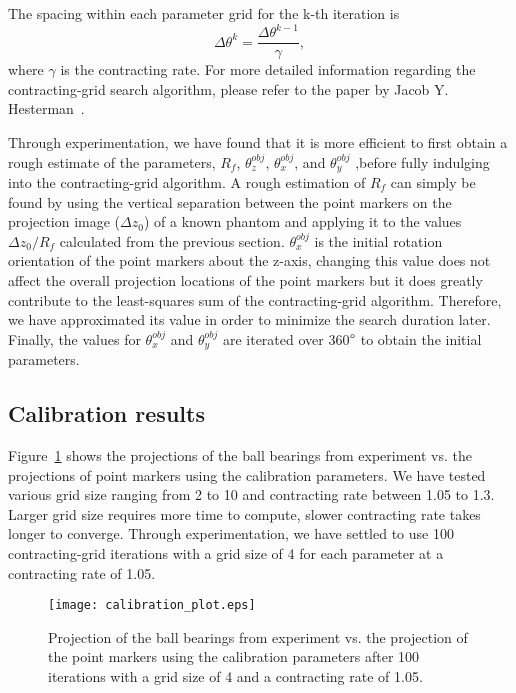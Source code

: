 The spacing within each parameter grid for the k-th iteration is
%
\begin{equation}
\label{eq:parameter_spacing}
\Delta \theta^k = \frac{\Delta \theta^{k-1}}{\gamma},
\end{equation}
%
where $\gamma$ is the contracting rate.  For more detailed information regarding the contracting-grid search algorithm, please refer to the paper by Jacob Y. Hesterman~\citep{Hesterman2010}.  

Through experimentation, we have found that it is more efficient to first obtain a rough estimate of the parameters, $R_f$, $\theta^{obj}_z$, $\theta^{obj}_x$, and $\theta^{obj}_y$ ,before fully indulging into the contracting-grid algorithm.  A rough estimation of $R_f$ can simply be found by using the vertical separation between the point markers on the projection image ($\Delta z_0$) of a known phantom and applying it to the values $\Delta z_0/R_f$ calculated from the previous section.  $\theta^{obj}_x$ is the initial rotation orientation of the point markers about the z-axis, changing this value does not affect the overall projection locations of the point markers but it does greatly contribute to the least-squares sum of the contracting-grid algorithm.  Therefore, we have approximated its value in order to minimize the search duration later.  Finally, the values for $\theta_x^{obj}$ and $\theta_y^{obj}$ are iterated over 360$\degree$ to obtain the initial parameters.

\subsection{Calibration results}
\label{subsect:cali_results}
Figure~\ref{fig:calibration_plot} shows the projections of the ball bearings from experiment vs. the projections of point markers using the calibration parameters.  We have tested various grid size ranging from 2 to 10 and contracting rate between 1.05 to 1.3.  Larger grid size requires more time to compute, slower contracting rate takes longer to converge.  Through experimentation, we have settled to use 100 contracting-grid iterations with a grid size of 4 for each parameter at a contracting rate of 1.05.
%
\begin{figure}[h]
\texttt{[image: calibration\_plot.eps]}
\caption{Projection of the ball bearings from experiment vs. the projection of the point markers using the calibration parameters after 100 iterations with a grid size of 4 and a contracting rate of 1.05.}
\label{fig:calibration_plot}
\end{figure}

